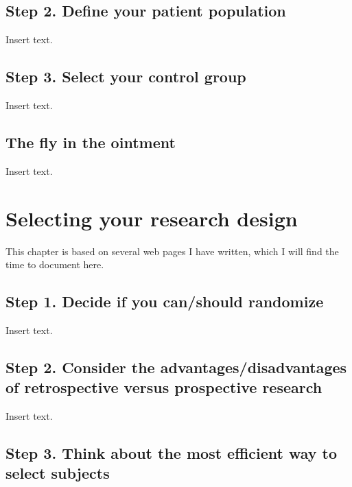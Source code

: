 \documentclass[
  letterpaper,
  DIV=11,
  numbers=noendperiod]{scrreprt}
\begin{document}
\section{Step 2. Define your patient
population}\label{step-2.-define-your-patient-population}

Insert text.

\section{Step 3. Select your control
group}\label{step-3.-select-your-control-group}

Insert text.

\section{The fly in the ointment}\label{the-fly-in-the-ointment}

Insert text.


\chapter{Selecting your research
design}\label{selecting-your-research-design}

This chapter is based on several web pages I have written, which I will
find the time to document here.

\section{Step 1. Decide if you can/should
randomize}\label{step-1.-decide-if-you-canshould-randomize}

Insert text.

\section{Step 2. Consider the advantages/disadvantages of retrospective
versus prospective
research}\label{step-2.-consider-the-advantagesdisadvantages-of-retrospective-versus-prospective-research}

Insert text.

\section{Step 3. Think about the most efficient way to select
subjects}\label{step-3.-think-about-the-most-efficient-way-to-select-subjects}
\end{document}
